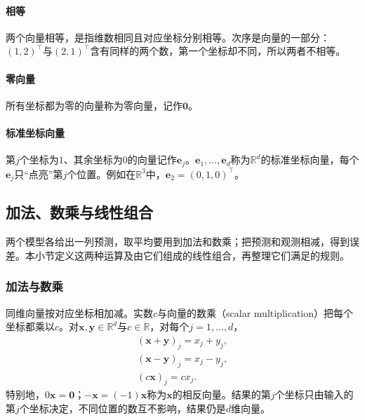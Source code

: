 \paragraph{相等} 两个向量相等，是指维数相同且对应坐标分别相等。次序是向量的一部分：$(1,2)^\top$与$(2,1)^\top$含有同样的两个数，第一个坐标却不同，所以两者不相等。

\paragraph{零向量} 所有坐标都为零的向量称为零向量，记作$\bm0$。

\paragraph{标准坐标向量} 第$j$个坐标为$1$、其余坐标为$0$的向量记作$\bm e_j$。$\bm e_1,\ldots,\bm e_d$称为$\mathbb R^d$的标准坐标向量，每个$\bm e_j$只“点亮”第$j$个位置。例如在$\mathbb R^3$中，$\bm e_2=(0,1,0)^\top$。

\subsection{加法、数乘与线性组合}
\label{sec:ls-vector-operations}

两个模型各给出一列预测，取平均要用到加法和数乘；把预测和观测相减，得到误差。本小节定义这两种运算及由它们组成的线性组合，再整理它们满足的规则。

\subsubsection{加法与数乘}
\label{sec:ls-addition-scaling}

同维向量按对应坐标相加减。实数$c$与向量的数乘（scalar multiplication）把每个坐标都乘以$c$。对$\bm x,\bm y\in\mathbb R^d$与$c\in\mathbb R$，对每个$j=1,\ldots,d$，
\begin{equation}
 \begin{gathered}
 (\bm x+\bm y)_j=x_j+y_j,\\
 (\bm x-\bm y)_j=x_j-y_j,\\
 (c\bm x)_j=cx_j.
 \end{gathered}
 \label{eq:ls-vector-addition-scaling}
\end{equation}
特别地，$0\bm x=\bm0$；$-\bm x=(-1)\bm x$称为$\bm x$的相反向量。结果的第$j$个坐标只由输入的第$j$个坐标决定，不同位置的数互不影响，结果仍是$d$维向量。

